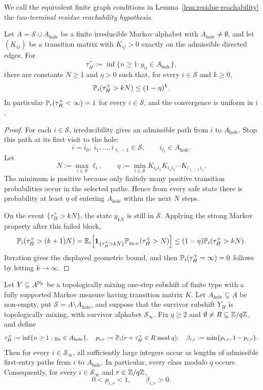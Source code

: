 \noindent
We call the equivalent finite graph conditions in
Lemma~\ref{lem:residue-reachability} the
\emph{two-terminal residue reachability hypothesis}.

\begin{lemma}
\label{lem:future-entry-estimate}
Let \(A=\mathcal S\sqcup A_{\mathrm{hole}}\) be a finite irreducible
Markov alphabet with \(A_{\mathrm{hole}}\neq\emptyset\), and let
\((K_{ij})\) be a transition matrix with \(K_{ij}>0\) exactly on the
admissible directed edges.  For
\[
  \tau_H^+:=\inf\{n\geq1:y_n\in A_{\mathrm{hole}}\},
\]
there are constants \(N\geq1\) and \(\eta>0\) such that, for every
\(i\in\mathcal S\) and \(k\geq0\),
\[
  \mathbb{P}_i(\tau_H^+>kN)\leq (1-\eta)^k.
\]
In particular \(\mathbb{P}_i(\tau_H^+<\infty)=1\) for every \(i\in\mathcal S\),
and the convergence is uniform in \(i\).
\end{lemma}

\begin{proof}
For each \(i\in\mathcal S\), irreducibility gives an admissible path
from \(i\) to \(A_{\mathrm{hole}}\).  Stop this path at its first visit
to the hole:
\[
  i=i_0,\ i_1,\ldots,i_{\ell_i-1}\in\mathcal S,\qquad
  i_{\ell_i}\in A_{\mathrm{hole}} .
\]
Let
\[
  N:=\max_{i\in\mathcal S}\ell_i,
  \qquad
  \eta:=\min_{i\in\mathcal S}
       K_{i_0i_1}K_{i_1i_2}\cdots K_{i_{\ell_i-1}i_{\ell_i}} .
\]
The minimum is positive because only finitely many positive transition
probabilities occur in the selected paths.  Hence from every safe state
there is probability at least \(\eta\) of entering
\(A_{\mathrm{hole}}\) within the next \(N\) steps.

On the event \(\{\tau_H^+>kN\}\), the state \(y_{kN}\) is still in
\(\mathcal S\).  Applying the strong Markov property after this failed
block,
\[
  \mathbb{P}_i(\tau_H^+>(k+1)N)
  =
  \mathbb{E}_i\!\left[
    \mathbf{1}_{\{\tau_H^+>kN\}}
    \mathbb{P}_{y_{kN}}(\tau_H^+>N)
  \right]
  \leq
  (1-\eta)\mathbb{P}_i(\tau_H^+>kN).
\]
Iteration gives the displayed geometric bound, and then
\(\mathbb{P}_i(\tau_H^+=\infty)=0\) follows by letting \(k\to\infty\).
\end{proof}

\begin{lemma}
\label{lem:automatic-recurrent-residues}
Let \(Y\subseteq A^{\mathbb{N}_0}\) be a topologically mixing one-step
subshift of finite type with a fully supported Markov measure having
transition matrix \(K\).  Let \(A_{\mathrm{hole}}\subsetneq A\) be non-empty, put
\(\mathcal S=A\setminus A_{\mathrm{hole}}\), and suppose that the
survivor subshift \(Y_H\) is topologically mixing, with survivor alphabet
\(\mathcal S_\infty\).  Fix \(q\geq2\) and
\(\emptyset\neq R\subsetneq\mathbb{Z}/q\mathbb{Z}\), and define
\[
  \tau_H^+:=\inf\{n\geq1:y_n\in A_{\mathrm{hole}}\},
  \quad
  p_{i,r}:=\mathbb{P}_i(r+\tau_H^+\in R\bmod q),
  \quad
  \beta_{i,r}:=\min\{p_{i,r},1-p_{i,r}\}.
\]
Then for every \(i\in\mathcal S_\infty\), all sufficiently large
integers occur as lengths of admissible first-entry paths from \(i\) to
\(A_{\mathrm{hole}}\).  In particular, every class modulo \(q\) occurs.
Consequently, for every
\(i\in\mathcal S_\infty\) and \(r\in\mathbb{Z}/q\mathbb{Z}\),
\[
  0<p_{i,r}<1,
  \qquad
  \beta_{i,r}>0.
\]
\end{lemma}

